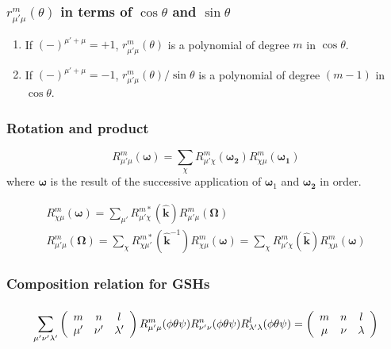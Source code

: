 \subsubsection*{$r_{\mu'\mu}^{m}(\theta)$ in terms of $\cos\theta$ and $\sin\theta$}
\begin{enumerate}
\item If $\left(-\right)^{\mu'+\mu}=+1$, $r_{\mu'\mu}^{m}(\theta)$ is
a polynomial of degree $m$ in $\cos\theta$.
\item If $\left(-\right)^{\mu'+\mu}=-1$, $r_{\mu'\mu}^{m}(\theta)/\sin\theta$
is a polynomial of degree $(m-1)$ in $\cos\theta$.
\end{enumerate}

\subsubsection*{Rotation and product}

\begin{equation}
R_{\mu'\mu}^{m}(\boldsymbol{\omega})=\sum_{\chi}R_{\mu'\chi}^{m}(\boldsymbol{\omega_{2}})R_{\chi\mu}^{m}(\boldsymbol{\omega_{1}})
\end{equation}
where $\boldsymbol{\omega}$ is the result of the successive application
of $\boldsymbol{\omega}_{1}$ and $\boldsymbol{\omega_{2}}$ in order.

\begin{equation}
\begin{array}{c}
{\displaystyle R_{\chi\mu}^{m}(\boldsymbol{\omega})=\sum_{\mu'}R_{\mu'\chi}^{m*}(\hat{\mathbf{k}})R_{\mu'\mu}^{m}(\mathbf{\Omega})}\\
{\displaystyle R_{\mu'\mu}^{m}(\mathbf{\Omega})=\sum_{\chi}R_{\chi\mu'}^{m*}(\hat{\mathbf{k}}^{-1})R_{\chi\mu}^{m}(\boldsymbol{\omega})=\sum_{\chi}R_{\mu'\chi}^{m}(\hat{\mathbf{k}})R_{\chi\mu}^{m}(\boldsymbol{\omega})}
\end{array}\label{eq:gsh-rotation}
\end{equation}


\subsubsection*{Composition relation for GSHs}

\subsubsection*{
\begin{equation}
\sum_{\mu'\nu'\lambda'}\left(\protect\begin{array}{ccc}
m & n & l\protect\\
\mu' & \nu' & \lambda'
\protect\end{array}\right)R_{\mu'\mu}^{m}(\phi\theta\psi)R_{\nu'\nu}^{n}(\phi\theta\psi)R_{\lambda'\lambda}^{l}(\phi\theta\psi)=\left(\protect\begin{array}{ccc}
m & n & l\protect\\
\mu & \nu & \lambda
\protect\end{array}\right)\label{eq:gg.a91}
\end{equation}
}

